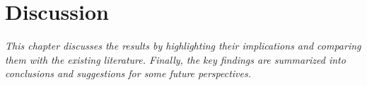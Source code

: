 
%


\chapter{Discussion}
\label{cha:discussion}


\textit{This chapter discusses the results by highlighting their implications and comparing them with the existing literature. Finally, the key findings are summarized into conclusions and suggestions for some future perspectives.}

